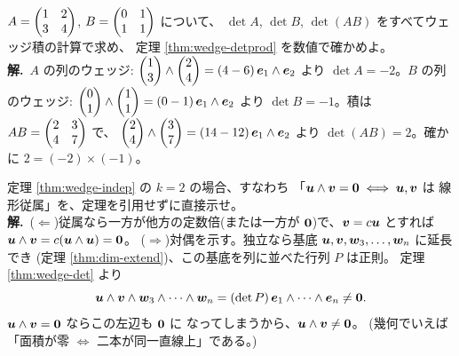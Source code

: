 \begin{rei}\label{rei:wedge-detprod2}
$A = \begin{pmatrix}1 & 2 \\ 3 & 4\end{pmatrix}$, $B = \begin{pmatrix}0 & 1 \\ 1 & 1\end{pmatrix}$ について、
$\det A$, $\det B$, $\det(AB)$ をすべてウェッジ積の計算で求め、
定理 \ref{thm:wedge-detprod} を数値で確かめよ。\\
\textbf{解.}\ $A$ の列のウェッジ:
$\begin{pmatrix}1 \\ 3\end{pmatrix} \wedge \begin{pmatrix}2 \\ 4\end{pmatrix} = (4 - 6)\,\bm{e}_1 \wedge \bm{e}_2$
より $\det A = -2$。$B$ の列のウェッジ:
$\begin{pmatrix}0 \\ 1\end{pmatrix} \wedge \begin{pmatrix}1 \\ 1\end{pmatrix} = (0 - 1)\,\bm{e}_1 \wedge \bm{e}_2$
より $\det B = -1$。積は
$AB = \begin{pmatrix}2 & 3 \\ 4 & 7\end{pmatrix}$ で、
$\begin{pmatrix}2 \\ 4\end{pmatrix} \wedge \begin{pmatrix}3 \\ 7\end{pmatrix} = (14 - 12)\,\bm{e}_1 \wedge \bm{e}_2$
より $\det(AB) = 2$。確かに $2 = (-2) \times (-1)$。
\end{rei}

\begin{rei}[例題・標準(証明:$2$ 本の場合の判定定理)]\label{rei:wedge-two}
定理 \ref{thm:wedge-indep} の $k = 2$ の場合、すなわち
「$\bm{u} \wedge \bm{v} = \bm{0} \iff \bm{u}, \bm{v}$ は
線形従属」を、定理を引用せずに直接示せ。\\
\textbf{解.}\ ($\Leftarrow$)従属なら一方が他方の定数倍(または一方が
$\bm{0}$)で、$\bm{v} = c\bm{u}$ とすれば
$\bm{u} \wedge \bm{v} = c(\bm{u} \wedge \bm{u}) = \bm{0}$。
($\Rightarrow$)対偶を示す。独立なら基底
$\bm{u}, \bm{v}, \bm{w}_3, \dots, \bm{w}_n$ に延長でき
(定理 \ref{thm:dim-extend})、この基底を列に並べた行列 $P$ は正則。
定理 \ref{thm:wedge-det} より
\[
\bm{u} \wedge \bm{v} \wedge \bm{w}_3 \wedge \cdots \wedge \bm{w}_n
= (\det P)\,\bm{e}_1 \wedge \cdots \wedge \bm{e}_n \neq \bm{0}.
\]
$\bm{u} \wedge \bm{v} = \bm{0}$ ならこの左辺も $\bm{0}$ に
なってしまうから、$\bm{u} \wedge \bm{v} \neq \bm{0}$。
(幾何でいえば「面積が零 $\iff$ 二本が同一直線上」である。)
\end{rei}

